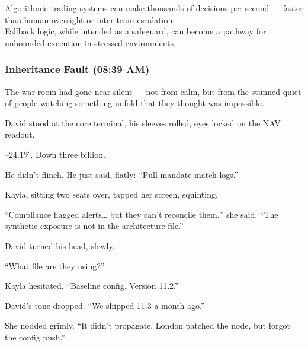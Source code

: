 \vspace{0.5em}
\begin{tcolorbox}[title=Latency and Automation, colback=gray!5, colframe=black]
Algorithmic trading systems can make thousands of decisions per second — faster than human oversight or inter-team escalation.\\
Fallback logic, while intended as a safeguard, can become a pathway for unbounded execution in stressed environments.
\end{tcolorbox}

\subsubsection{Inheritance Fault (08:39 AM)} 

The war room had gone near-silent — not from calm, but from the stunned quiet of people watching something unfold that they thought was impossible.

David stood at the core terminal, his sleeves rolled, eyes locked on the NAV readout.

–24.1\%.
Down three billion.

He didn’t flinch. He just said, flatly:
“Pull mandate match logs.”

Kayla, sitting two seats over, tapped her screen, squinting.

“Compliance flagged alerts… but they can’t reconcile them,” she said. “The synthetic exposure is not in 
the architecture file.”

David turned his head, slowly.

“What file are they using?”

Kayla hesitated. “Baseline config. Version 11.2.”

David’s tone dropped. “We shipped 11.3 a month ago.”

She nodded grimly. “It didn’t propagate. London patched the node, but forgot the config push.”

\medskip

